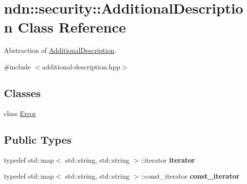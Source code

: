 \hypertarget{classndn_1_1security_1_1AdditionalDescription}{}\section{ndn\+:\+:security\+:\+:Additional\+Description Class Reference}
\label{classndn_1_1security_1_1AdditionalDescription}


Abstraction of \hyperlink{classndn_1_1security_1_1AdditionalDescription}{Additional\+Description}.  




{\ttfamily \#include $<$additional-\/description.\+hpp$>$}

\subsection*{Classes}
\begin{DoxyCompactItemize}
\item 
class \hyperlink{classndn_1_1security_1_1AdditionalDescription_1_1Error}{Error}
\end{DoxyCompactItemize}
\subsection*{Public Types}
\begin{DoxyCompactItemize}
\item 
typedef std\+::map$<$ std\+::string, std\+::string $>$\+::iterator {\bfseries iterator}\hypertarget{classndn_1_1security_1_1AdditionalDescription_ac48d5d1257c0534f5f2ede3fe9aeb6cf}{}\label{classndn_1_1security_1_1AdditionalDescription_ac48d5d1257c0534f5f2ede3fe9aeb6cf}

\item 
typedef std\+::map$<$ std\+::string, std\+::string $>$\+::const\+\_\+iterator {\bfseries const\+\_\+iterator}\hypertarget{classndn_1_1security_1_1AdditionalDescription_a815da03211fa15c2f92c500c0fade25e}{}\label{classndn_1_1security_1_1AdditionalDescription_a815da03211fa15c2f92c500c0fade25e}

\end{DoxyCompactItemize}
